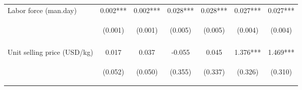 \begin{center}
\begin{tabular}{lcccccc}
Labor force (man.day) & 0.002*** & 0.002*** & 0.028*** & 0.028*** & 0.027*** & 0.027*** \\
 & \begin{footnotesize}(0.001)\end{footnotesize} & \begin{footnotesize}(0.001)\end{footnotesize} & \begin{footnotesize}(0.005)\end{footnotesize} & \begin{footnotesize}(0.005)\end{footnotesize} & \begin{footnotesize}(0.004)\end{footnotesize} & \begin{footnotesize}(0.004)\end{footnotesize} \\
\vspace{4pt} & \begin{footnotesize}[0.002]\end{footnotesize} & \begin{footnotesize}[0.002]\end{footnotesize} & \begin{footnotesize}[0.000]\end{footnotesize} & \begin{footnotesize}[0.000]\end{footnotesize} & \begin{footnotesize}[0.000]\end{footnotesize} & \begin{footnotesize}[0.000]\end{footnotesize} \\
Unit selling price (USD/kg) & 0.017 & 0.037 & -0.055 & 0.045 & 1.376*** & 1.469*** \\
 & \begin{footnotesize}(0.052)\end{footnotesize} & \begin{footnotesize}(0.050)\end{footnotesize} & \begin{footnotesize}(0.355)\end{footnotesize} & \begin{footnotesize}(0.337)\end{footnotesize} & \begin{footnotesize}(0.326)\end{footnotesize} & \begin{footnotesize}(0.310)\end{footnotesize} \\

\end{tabular}
\end{center}
